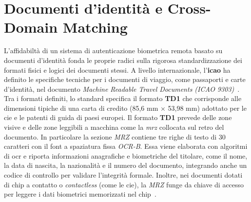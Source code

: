 \section{Documenti d'identità e Cross-Domain Matching}
L'affidabiltà di un sistema di autenticazione biometrica remota basato su documenti d'identità fonda le proprie radici sulla rigorosa standardizzazione dei formati fisici e logici dei documenti stessi. A livello internazionale, l'\textbf{\gls{icao}} ha definito le specifiche tecniche per i documenti di viaggio, come passaporti e carte d'identità, nel documento \textit{Machine Readable Travel Documents (ICAO 9303)}~\cite{icao9303}.
Tra i formati definiti, lo standard specifica il formato \textbf{TD1} che corrisponde alle dimensioni tipiche di una carta di credito (85,6 mm × 53,98 mm) adottato per le \gls{cie} e le patenti di guida di paesi europei.
Il formato \textbf{TD1} prevede delle zone visive e delle zone leggibili a macchina come la \textit{\gls{mrz}} collocata sul retro del documento.
In particolare la sezione \textit{MRZ} contiene tre righe di testo di 30 caratteri con il font a spaziatura fissa \textit{OCR-B}. 
Essa viene elaborata con algoritmi di \gls{ocr} e riporta informazioni anagrafiche e biometriche del titolare, come il nome, la data di nascita, la nazionalità e il numero del documento, integrando anche un codice di controllo per validare l'integrità formale.
Inoltre, nei documenti dotati di chip a contatto o \textit{contactless} (come le \gls{cie}), la \textit{MRZ} funge da chiave di accesso per leggere i dati biometrici memorizzati nel chip~\cite{kelesRepublicTurkeyIdentity2020}.

